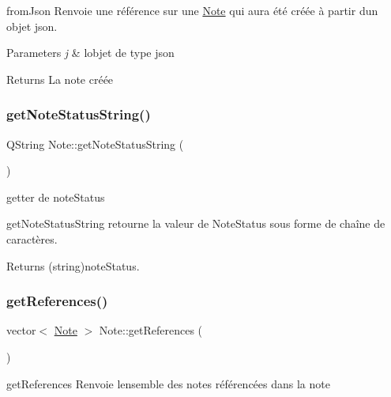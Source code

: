 from\+Json Renvoie une référence sur une \hyperlink{classNote}{Note} qui aura été créée à partir d\textquotesingle{}un objet json. 


\begin{DoxyParams}{Parameters}
{\em j} & l\textquotesingle{}objet de type json \\
\hline
\end{DoxyParams}
\begin{DoxyReturn}{Returns}
La note créée 
\end{DoxyReturn}
\mbox{\label{classNote_aaabdeec91ac3ba33d4513f11da478f6d}} 
\subsubsection{\texorpdfstring{get\+Note\+Status\+String()}{getNoteStatusString()}}
{\footnotesize\ttfamily Q\+String Note\+::get\+Note\+Status\+String (\begin{DoxyParamCaption}{ }\end{DoxyParamCaption})\hspace{0.3cm}{\ttfamily [inline]}}



getter de note\+Status 

get\+Note\+Status\+String retourne la valeur de Note\+Status sous forme de chaîne de caractères. \begin{DoxyReturn}{Returns}
(string)note\+Status. 
\end{DoxyReturn}
\mbox{\label{classNote_ae98495ca6805e2bfa8da4d1d03ed449b}} 
\subsubsection{\texorpdfstring{get\+References()}{getReferences()}}
{\footnotesize\ttfamily vector$<$ \hyperlink{classNote}{Note} $>$ Note\+::get\+References (\begin{DoxyParamCaption}{ }\end{DoxyParamCaption})}



get\+References Renvoie l\textquotesingle{}ensemble des notes référencées dans la note 


